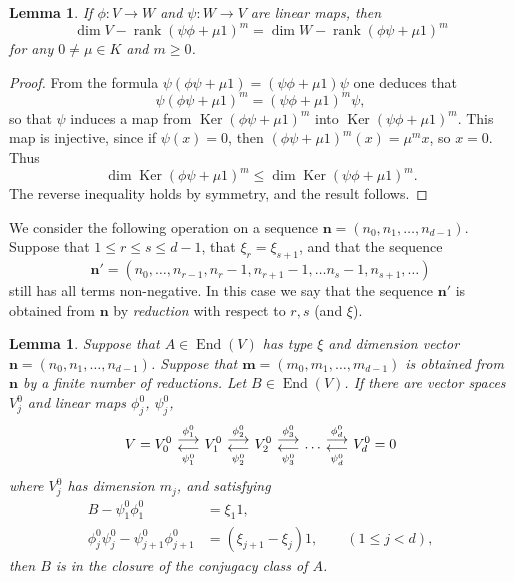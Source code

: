\documentclass{amsart}
\theoremstyle{plain}
\newtheorem{lem}[thm]{Lemma}
\theoremstyle{definition}
\theoremstyle{remark}
\DeclareMathOperator{\Ker}{Ker}
\DeclareMathOperator{\End}{End}
\DeclareMathOperator{\rank}{rank}
\DeclareMathOperator*{\rightoverleft}{\parbox{2em}{\centerline{$\longrightarrow$}\vskip -6pt\centerline{$\longleftarrow$}}}
\begin{document}
\begin{lem}
\label{l:mapsback}
If $\phi:V\to W$ and $\psi:W\to V$ are linear maps, then
\[
\dim V - \rank (\psi\phi + \mu 1)^m = \dim W - \rank (\phi\psi + \mu 1)^m
\]
for any $0\neq\mu\in K$ and $m\ge 0$.
\end{lem}

\begin{proof}
From the formula $\psi(\phi\psi + \mu 1) = (\psi\phi+\mu 1) \psi$
one deduces that
\[
\psi(\phi\psi + \mu 1)^m = (\psi\phi+\mu 1)^m \psi,
\]
so that $\psi$ induces a map from $\Ker(\phi\psi + \mu 1)^m$ into $\Ker (\psi\phi+\mu 1)^m$.
This map is injective, since if $\psi(x)=0$, then $(\phi\psi + \mu 1)^m (x)=\mu^m x$, so $x=0$.
Thus
\[
\dim \Ker(\phi\psi + \mu 1)^m \le \dim\Ker (\psi\phi+\mu 1)^m.
\]
The reverse inequality holds by symmetry, and the result follows.
\end{proof}


We consider the following operation on a sequence $\mathbf{n} = (n_0,n_1,\dots,n_{d-1})$.
Suppose that $1\le r\le s\le d-1$, that $\xi_r = \xi_{s+1}$, and that
the sequence
\[
\mathbf{n'} = (n_0,\dots,n_{r-1},n_r-1,n_{r+1}-1,\dots n_s-1,n_{s+1},\dots)
\]
still has all terms non-negative. In this case we say that
the sequence $\mathbf{n'}$ is obtained from $\mathbf{n}$ by \emph{reduction} with respect to $r,s$ (and $\xi$).


\begin{lem}
\label{l:oddconjclo}
Suppose that $A\in\End(V)$ has type $\xi$ and dimension vector $\mathbf{n} = (n_0,n_1,\dots,n_{d-1})$.
Suppose that $\mathbf{m} = (m_0,m_1,\dots,m_{d-1})$ is obtained from $\mathbf{n}$
by a finite number of reductions.
Let $B\in\End(V)$.
If there are vector spaces $V^0_j$ and linear maps $\phi^0_j$, $\psi^0_j$,
\[
V=V^0_0 \rightoverleft^{\phi^0_{1}}_{\psi^0_{1}} V^0_{1} \rightoverleft^{\phi^0_{2}}_{\psi^0_{2}} V^0_{2}
\rightoverleft^{\phi^0_{3}}_{\psi^0_{3}} \dots
\rightoverleft^{\phi^0_{d}}_{\psi^0_{d}} V^0_{d}=0
\]
where $V^0_j$ has dimension $m_j$, and satisfying
\[
\begin{split}
B - \psi^0_{1} \phi^0_{1}
&= \xi_{1} 1,
\\
\phi^0_{j} \psi^0_{j} - \psi^0_{j+1}\phi^0_{j+1}
&= (\xi_{j+1}-\xi_{j}) 1,
\qquad (1\le j < d),
\end{split}
\]
then $B$ is in the closure of the conjugacy class of $A$.
\end{lem}
\end{document}
